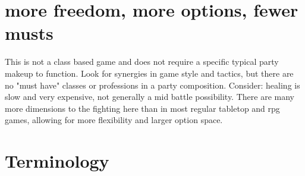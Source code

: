 \section*{more freedom, more options, fewer musts}
This is not a class based game and does not require a specific typical party makeup to function. Look for synergies in game style and tactics, but there are no "must have" classes or professions in a party composition. Consider: healing is slow and very expensive, not generally a mid battle possibility. There are many more dimensions to the fighting here than in most regular tabletop and rpg games, allowing for more flexibility and larger option space.










\section*{Terminology}

